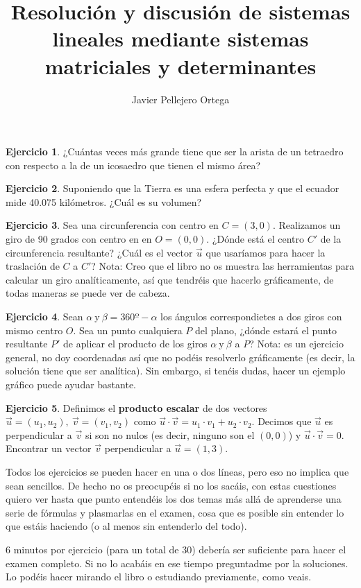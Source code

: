 \documentclass[11pt, oneside]{book}
\title{Resolución y discusión de sistemas lineales mediante sistemas matriciales y determinantes}
\author{Javier Pellejero Ortega}
\theoremstyle{definition} %
\newtheorem{ejercicio}{Ejercicio}
\newcommand{\y}{\mathrm{\ y\ }}
\begin{document}
\begin{ejercicio} ¿Cuántas veces más grande tiene que ser la arista de un tetraedro con respecto a la de un icosaedro que tienen el mismo área?
\end{ejercicio}

\begin{ejercicio} Suponiendo que la Tierra es una esfera perfecta y que el ecuador mide 40.075 kilómetros. ¿Cuál es su volumen?
\end{ejercicio}

\begin{ejercicio} Sea una circunferencia con centro en $C=(3,0)$. Realizamos un giro de 90 grados con centro en en $O=(0,0)$. ¿Dónde está el centro $C'$ de la circunferencia resultante? ¿Cuál es el vector $\vec{u}$ que usaríamos para hacer la traslación de $C$ a $C'$? Nota: Creo que el libro no os muestra las herramientas para calcular un giro analíticamente, así que tendréis que hacerlo gráficamente, de todas maneras se puede ver de cabeza.
\end{ejercicio}

\begin{ejercicio} Sean $\alpha\y\beta=360º -\alpha$ los ángulos correspondietes a dos giros con mismo centro $O$. Sea un punto cualquiera $P$ del plano, ¿dónde estará el punto resultante $P'$ de aplicar el producto de los giros $\alpha\y\beta$  a $P$? Nota: es un ejercicio general, no doy coordenadas así que no podéis resolverlo gráficamente (es decir, la solución tiene que ser analítica). Sin embargo, si tenéis dudas, hacer un ejemplo gráfico puede ayudar bastante.
\end{ejercicio}

\begin{ejercicio} Definimos el \textbf{producto escalar} de dos vectores $\vec u=(u_1,u_2),\ \vec{v}=(v_1,v_2)$ como $\vec{u}\cdot\vec{v}=u_1\cdot v_1 + u_2\cdot v_2$. Decimos que $\vec{u}$ es perpendicular a $\vec{v}$ si son no nulos (es decir, ninguno son el $(0,0)$) y $\vec{u}\cdot\vec{v}=0$. Encontrar un vector $\vec{v}$ perpendicular a $\vec{u}=(1,3)$.
\end{ejercicio}

Todos los ejercicios se pueden hacer en una o dos líneas, pero eso no implica que sean sencillos. De hecho no os preocupéis si no los sacáis, con estas cuestiones quiero ver hasta que punto entendéis los dos temas más allá de aprenderse una serie de fórmulas y plasmarlas en el examen, cosa que es posible sin entender lo que estáis haciendo (o al menos sin entenderlo del todo).

6 minutos por ejercicio (para un total de 30) debería ser suficiente para hacer el examen completo. Si no lo acabáis en ese tiempo preguntadme por la soluciones. Lo podéis hacer mirando el libro o estudiando previamente, como veais.
\end{document}
